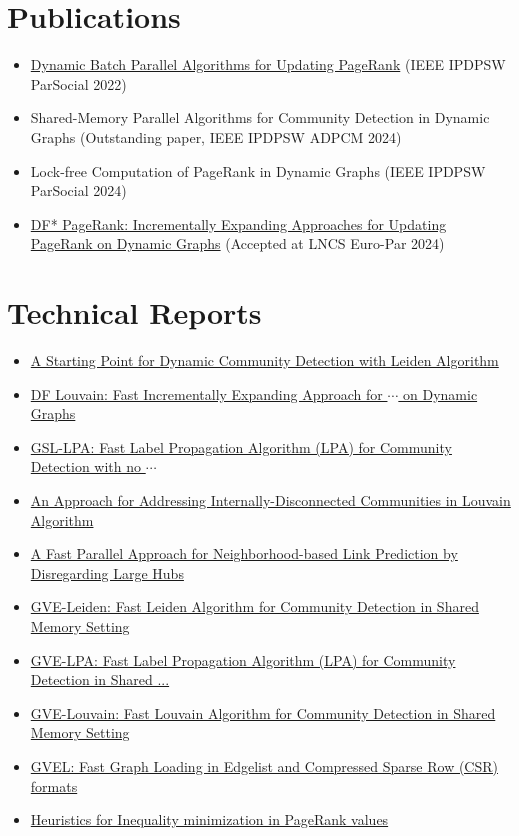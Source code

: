 \section*{Publications}

\begin{itemize}[noitemsep, leftmargin=*]
  \item \href{https://ieeexplore.ieee.org/abstract/document/9835216/}{Dynamic Batch Parallel Algorithms for Updating PageRank} (IEEE IPDPSW ParSocial 2022)
  \item Shared-Memory Parallel Algorithms for Community Detection in Dynamic Graphs (Outstanding paper, IEEE IPDPSW ADPCM 2024)
  \item Lock-free Computation of PageRank in Dynamic Graphs (IEEE IPDPSW ParSocial 2024)
  \item \href{https://arxiv.org/abs/2401.15870}{DF* PageRank: Incrementally Expanding Approaches for Updating PageRank on Dynamic Graphs} (Accepted at LNCS Euro-Par 2024)
\end{itemize}




\section*{Technical Reports}

\begin{itemize}[noitemsep, leftmargin=*]
  \item \href{https://arxiv.org/abs/2405.11658}{A Starting Point for Dynamic Community Detection with Leiden Algorithm}
  \item \href{https://arxiv.org/abs/2404.19634}{DF Louvain: Fast Incrementally Expanding Approach for $\cdots$ on Dynamic Graphs}
  \item \href{https://arxiv.org/abs/2403.01261}{GSL-LPA: Fast Label Propagation Algorithm (LPA) for Community Detection with no $\cdots$}
  \item \href{https://arxiv.org/abs/2402.11454}{An Approach for Addressing Internally-Disconnected Communities in Louvain Algorithm}
  \item \href{https://arxiv.org/abs/2401.11415}{A Fast Parallel Approach for Neighborhood-based Link Prediction by Disregarding Large Hubs}
  \item \href{https://arxiv.org/abs/2312.13936}{GVE-Leiden: Fast Leiden Algorithm for Community Detection in Shared Memory Setting}
  \item \href{https://arxiv.org/abs/2312.08140}{GVE-LPA: Fast Label Propagation Algorithm (LPA) for Community Detection in Shared ...}
  \item \href{https://arxiv.org/abs/2312.04876}{GVE-Louvain: Fast Louvain Algorithm for Community Detection in Shared Memory Setting}
  \item \href{https://arxiv.org/abs/2311.14650}{GVEL: Fast Graph Loading in Edgelist and Compressed Sparse Row (CSR) formats}
  \item \href{https://arxiv.org/abs/2310.18537}{Heuristics for Inequality minimization in PageRank values}
\end{itemize}




